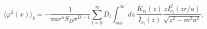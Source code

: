 \begin{equation}
\langle \varphi ^{2}(x)\rangle _{b}=-\frac{1}{\pi
ar^{n}S_{D}\sigma ^{D-1}} \sum_{l=0}^{\infty }D_{l}\int_{ma
}^{\infty }dz\ \frac{\bar{K}_{\nu _{l} }(z)}{\bar{I}_{\nu _{l}
}(z)}\frac{zI_{\nu _{l} }^{2}(zr/a)}{\sqrt{z^{2}-m^{2}a^{2}}},
\label{regsquare}
\end{equation}

